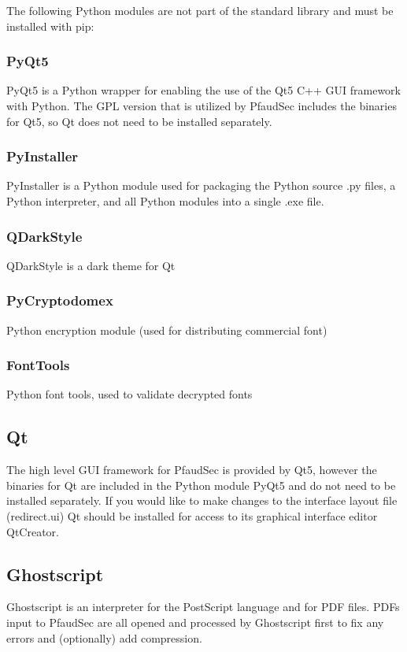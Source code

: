 \documentclass[14pt]{article}
\begin{document}
\begin{flushleft}
The following Python modules are not part of the standard library and must be installed with pip:

		\begin{subs}
		\subsubsection{PyQt5}
PyQt5 is a Python wrapper for enabling the use of the Qt5 C++ GUI framework with Python.
The GPL version that is utilized by PfaudSec includes the binaries for Qt5, so Qt does not need to be installed separately.

		\subsubsection{PyInstaller}
PyInstaller is a Python module used for packaging the Python source .py files, a Python interpreter, and all Python modules into a single .exe file.

		\subsubsection{QDarkStyle}
QDarkStyle is a dark theme for Qt

		\subsubsection{PyCryptodomex}
Python encryption module (used for distributing commercial font)

		\subsubsection{FontTools}
Python font tools, used to validate decrypted fonts
		\end{subs}

	\subsection{Qt}
The high level GUI framework for PfaudSec is provided by Qt5, however the binaries for Qt are included in the Python module PyQt5 and do not need to be installed separately.
If you would like to make changes to the interface layout file (redirect.ui) Qt should be installed for access to its graphical interface editor QtCreator.

	\subsection{Ghostscript}
Ghostscript is an interpreter for the PostScript language and for PDF files.
PDFs input to PfaudSec are all opened and processed by Ghostscript first to fix any errors and (optionally) add compression.


\end{flushleft}
\end{document}
